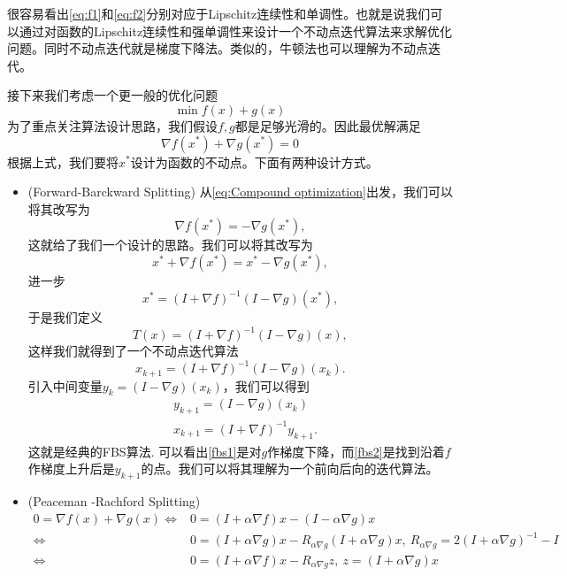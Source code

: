 \begin{remark}
    很容易看出\eqref{eq:f1}和\eqref{eq:f2}分别对应于Lipschitz连续性和单调性。也就是说我们可以通过对函数的Lipschitz连续性和强单调性来设计一个不动点迭代算法来求解优化问题。同时不动点迭代就是梯度下降法。类似的，牛顿法也可以理解为不动点迭代。
\end{remark}
接下来我们考虑一个更一般的优化问题
\begin{equation}\label{eq:opt_problem}
\min f(x) + g(x)
\end{equation}
为了重点关注算法设计思路，我们假设$f,g$都是足够光滑的。因此最优解满足
\begin{equation}\label{eq:Compound optimization}
    \nabla f(x^*) + \nabla g(x^*) = 0
\end{equation}
根据上式，我们要将$x^*$设计为函数的不动点。下面有两种设计方式。
\begin{itemize}
    \item (Forward-Barckward Splitting) 从\eqref{eq:Compound optimization}出发，我们可以将其改写为
    \[\nabla f(x^*) = -\nabla g(x^*),\]
    这就给了我们一个设计的思路。我们可以将其改写为
    \[
    x^*+\nabla f(x^*) = x^*-\nabla g(x^*),
    \]
    进一步
    \[
    x^* = (I+\nabla f )^{-1}(I-\nabla g)(x^*),
    \]
    于是我们定义
    \[
    T(x) = (I+\nabla f )^{-1}(I-\nabla g)(x),
    \]
    这样我们就得到了一个不动点迭代算法
    \[
    x_{k+1} = (I+\nabla f )^{-1}(I-\nabla g)(x_k).
    \]
    引入中间变量$y_k = (I-\nabla g)(x_k)$，我们可以得到
    \begin{align}
       & y_{k+1} = (I-\nabla g)(x_k)\label{fbs1}\\
        &x_{k+1} = (I+\nabla f )^{-1}y_{k+1}.\label{fbs2}
    \end{align}
    这就是经典的FBS算法. 可以看出\eqref{fbs1}是对$g$作梯度下降，而\eqref{fbs2}是找到沿着$f$作梯度上升后是$y_{k+1}$的点。我们可以将其理解为一个前向后向的迭代算法。
    \item (Peaceman -Rachford Splitting)
    \begin{equation}
        \begin{aligned}
            0=\nabla f(x) + \nabla g(x)\Longleftrightarrow& 0 = (I+\alpha \nabla f)x -(I-\alpha \nabla g)x\\
            \Longleftrightarrow& 0 = (I+\alpha \nabla g)x - R_{\alpha \nabla g}(I+\alpha \nabla g)x, \ R_{\alpha \nabla g}=2(I+\alpha \nabla g)^{-1}-I\\
            \Longleftrightarrow& 0 = (I+\alpha \nabla f)x - R_{\alpha \nabla g}z ,\  z = (I+\alpha \nabla g)x \\

\end{aligned}
\end{equation}
\end{itemize}
